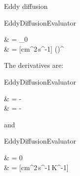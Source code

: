 Eddy diffusion 
\begin{equationCode}{EddyDiffusionEvaluator}
\begin{split}
\eddy              &     = \eddy_0   \\
\uu [cm^2\,s^{-1}] & \uu = [cm^2\,s^{-1}] \left(\frac{[cm^{-3}]}{[cm^{-3}]}\right)^{} \\
\end{split}
\label{Titan:eddy_diff}
\end{equationCode}

The derivatives are:
\begin{equationCode}{EddyDiffusionEvaluator}
\begin{split}
 & = -  \\
\uu \frac{[cm^2\,s^{-1}]}{[cm^{-3}]} & \uu = -\frac{[cm^2\,s^{-1}]}{[cm^{-3}]}
\end{split}
\label{Titan:eddy_diff_der_n}
\end{equationCode}
%
and
%
\begin{equationCode}{EddyDiffusionEvaluator}
\begin{split}
 & = 0 \\
\uu \frac{[cm^2\,s^{-1}]}{[K]} & \uu = [cm^2\,s^{-1}\,K^{-1}]
\end{split}
\label{Titan:eddy_diff_der_T}
\end{equationCode}

